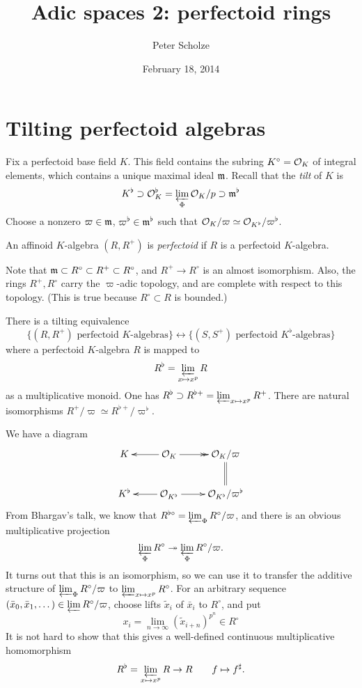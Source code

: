 \documentclass{article}
\title{Adic spaces 2: perfectoid rings}
\author{Peter Scholze}
\date{February 18, 2014}
\begin{document}
\maketitle





\section{Tilting perfectoid algebras}

Fix a perfectoid base field $K$. This field contains the subring $K^\circ=\mathcal{O}_K$ 
of integral elements, which contains a unique maximal ideal $\mathfrak{m}$. Recall that 
the \emph{tilt} of $K$ is 
\[
  K^\flat \supset \mathcal{O}_K^\flat = \varprojlim_\Phi \mathcal{O}_K/p\supset \mathfrak{m}^\flat
\]
Choose a nonzero $\varpi\in \mathfrak{m}$, $\varpi^\flat\in \mathfrak{m}^\flat$ such that 
$\mathcal{O}_K/\varpi \simeq \mathcal{O}_{K^\flat}/\varpi^\flat$. 

\begin{definition}
An affinoid $K$-algebra $(R,R^+)$ is \emph{perfectoid} if $R$ is a 
perfectoid $K$-algebra. 
\end{definition}

Note that $\mathfrak{m}\subset R^\circ \subset R^+\subset R^\circ$, and 
$R^+ \to R^\circ$ is an almost isomorphism. Also, the rings $R^+,R^\circ$ carry 
the $\varpi$-adic topology, and are complete with respect to this topology. 
(This is true because $R^\circ\subset R$ is bounded.) 

\begin{proposition}
There is a tilting equivalence 
\[
  \{(R,R^+)\text{ perfectoid $K$-algebras}\} \leftrightarrow \{(S,S^+)\text{ perfectoid $K^\flat$-algebras}\}
\]
where a perfectoid $K$-algebra $R$ is mapped to 
\[
  R^\flat = \varprojlim_{x\mapsto x^p} R
\]
as a multiplicative monoid. One has 
$R^\flat\supset R^{\flat +} = \varprojlim_{x\mapsto x^p} R^+$. There are 
natural isomorphisms $R^+/\varpi \simeq R^{\flat +}/\varpi^\flat$. 
\end{proposition}

We have a diagram 
\[\xymatrix{
  K 
    & \ar[l] \cO_K \ar@{->>}[r] 
    & \cO_K/\varpi \ar@{=}[d] \\
  K^\flat 
    & \ar[l] \cO_{K^\flat} \ar[r] 
    & \cO_{K^\flat} / \varpi^\flat
}\]
From Bhargav's talk, we know that 
$R^{\flat\circ} = \varprojlim_\Phi R^\circ/\varpi$, and there is an obvious multiplicative 
projection 
\[
  \varprojlim_\Phi R^\circ \twoheadrightarrow \varprojlim_\Phi R^\circ/\varpi .
\]
It turns out that this is an isomorphism, so we can use it to transfer the 
additive structure of $\varprojlim_\Phi R^\circ/\varpi$ to $\varprojlim_{x\mapsto x^p} R^\circ$. 
For an arbitrary sequence $(\bar x_0,\bar x_1,\dots)\in \varprojlim R^\circ/\varpi$, 
choose lifts $\tilde x_i$ of $\bar x_i$ to $R^\circ$, and put 
\[
  x_i = \lim_{n\to \infty} (\tilde x_{i+n})^{p^n} \in R^\circ
\]
It is not hard to show that this gives a well-defined continuous multiplicative 
homomorphism 
\[
  R^\flat = \varprojlim_{x\mapsto x^p} R \to R \qquad f\mapsto f^\sharp .
\]
\end{document}
